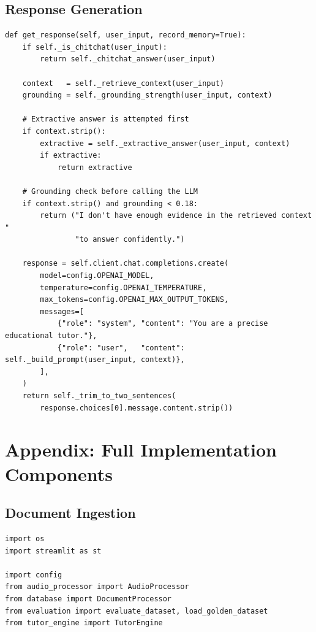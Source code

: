 \documentclass[12pt,a4paper]{article}
\begin{document}
\subsection*{Response Generation}
\begin{lstlisting}[caption={Grounded response logic in tutor\_engine.py}]
def get_response(self, user_input, record_memory=True):
    if self._is_chitchat(user_input):
        return self._chitchat_answer(user_input)

    context   = self._retrieve_context(user_input)
    grounding = self._grounding_strength(user_input, context)

    # Extractive answer is attempted first
    if context.strip():
        extractive = self._extractive_answer(user_input, context)
        if extractive:
            return extractive

    # Grounding check before calling the LLM
    if context.strip() and grounding < 0.18:
        return ("I don't have enough evidence in the retrieved context "
                "to answer confidently.")

    response = self.client.chat.completions.create(
        model=config.OPENAI_MODEL,
        temperature=config.OPENAI_TEMPERATURE,
        max_tokens=config.OPENAI_MAX_OUTPUT_TOKENS,
        messages=[
            {"role": "system", "content": "You are a precise educational tutor."},
            {"role": "user",   "content": self._build_prompt(user_input, context)},
        ],
    )
    return self._trim_to_two_sentences(
        response.choices[0].message.content.strip())
\end{lstlisting}



\newpage
\section*{Appendix: Full Implementation Components}

\subsection*{Document Ingestion}
\begin{lstlisting}[caption={app.py}]
import os
import streamlit as st

import config
from audio_processor import AudioProcessor
from database import DocumentProcessor
from evaluation import evaluate_dataset, load_golden_dataset
from tutor_engine import TutorEngine
\end{lstlisting}
\end{document}
